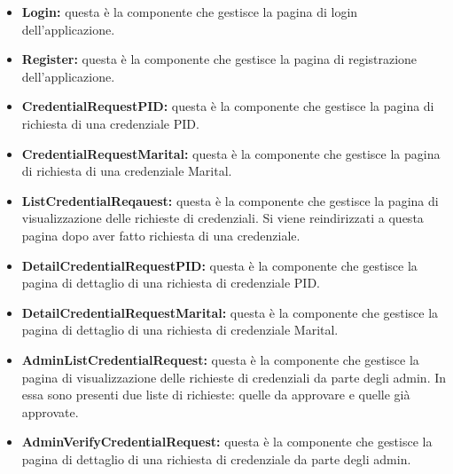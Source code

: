 \begin{itemize}
    \item \textbf{Login:} questa è la componente che gestisce la pagina di login dell'applicazione. 
    \item \textbf{Register:} questa è la componente che gestisce la pagina di registrazione dell'applicazione.
    \item \textbf{CredentialRequestPID:} questa è la componente che gestisce la pagina di richiesta di una credenziale PID.
    \item \textbf{CredentialRequestMarital:} questa è la componente che gestisce la pagina di richiesta di una credenziale Marital.
    \item \textbf{ListCredentialReqauest:} questa è la componente che gestisce la pagina di visualizzazione delle richieste di credenziali. Si viene reindirizzati
    a questa pagina dopo aver fatto richiesta di una credenziale.
    \item \textbf{DetailCredentialRequestPID:} questa è la componente che gestisce la pagina di dettaglio di una richiesta di credenziale PID.
    \item \textbf{DetailCredentialRequestMarital:} questa è la componente che gestisce la pagina di dettaglio di una richiesta di credenziale Marital.
    \item \textbf{AdminListCredentialRequest:} questa è la componente che gestisce la pagina di visualizzazione delle richieste di credenziali da parte degli admin.
    In essa sono presenti due liste di richieste: quelle da approvare e quelle già approvate.
    \item \textbf{AdminVerifyCredentialRequest:} questa è la componente che gestisce la pagina di dettaglio di una richiesta di credenziale da parte degli admin.
\end{itemize}

